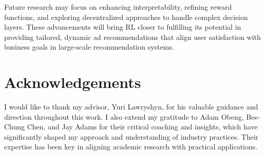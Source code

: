 \documentclass[final]{anthology-ch}         %
\begin{document}
Future research may focus on enhancing interpretability, refining reward functions, and exploring decentralized approaches to handle complex decision layers. These advancements will bring RL closer to fulfilling its potential in providing tailored, dynamic ad recommendations that align user satisfaction with business goals in large-scale recommendation systems.




\section*{Acknowledgements}
I would like to thank my advisor, Yuri Lawryshyn, for his valuable guidance and direction throughout this work. I also extend my gratitude to Adam Obeng, Bee-Chung Chen, and Jay Adams for their critical coaching and insights, which have significantly shaped my approach and understanding of industry practices. Their expertise has been key in aligning academic research with practical applications.


% 

\printbibliography
\end{document}
